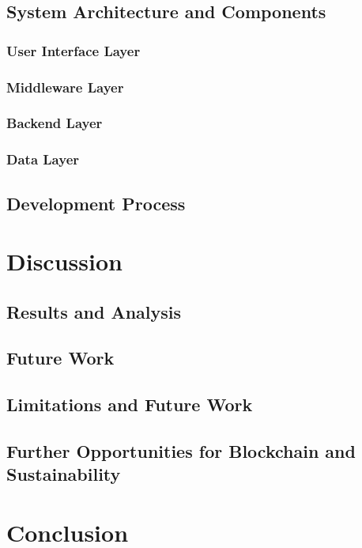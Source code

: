 \documentclass[11pt]{report}
\begin{document}
\section{System Architecture and Components}
\subsection{User Interface Layer}
\subsection{Middleware Layer}
\subsection{Backend Layer}
\subsection{Data Layer}
\section{Development Process}

\chapter{Discussion}
\section{Results and Analysis}
\section{Future Work}



\newpage


\section{Limitations and Future Work} \label{se:limitations}
\section{Further Opportunities for Blockchain and Sustainability}

\chapter{Conclusion}



\end{document}
